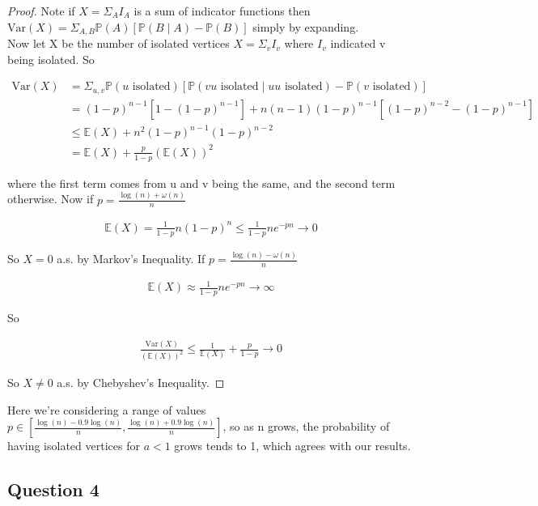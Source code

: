 \documentclass[10pt,a4paper]{report}
\begin{document}
\begin{proof}
Note if $X=\Sigma_A I_A$ is a sum of indicator functions then $\text{Var}(X)=\Sigma_{A,B}\mathbb{P}(A)[ \mathbb{P}(B \mid A) -\mathbb{P}(B)]$ simply by expanding.\\

Now let X be the number of isolated vertices $X=\Sigma_v I_v$ where $I_v$ indicated v being isolated. So 

\begin{align*}
\text{Var}(X)&=\Sigma_{u,v} \mathbb{P}(u \text{ isolated})[ \mathbb{P}(v u \text{ isolated} \mid u u \text{ isolated}) -\mathbb{P}(v \text{ isolated})]\\
&=(1-p)^{n-1}[1-(1-p)^{n-1}] + n(n-1)(1-p)^{n-1}[(1-p)^{n-2}-(1-p)^{n-1}]\\
&\leq \mathbb{E}(X)+n^2(1-p)^{n-1}(1-p)^{n-2}\\
&= \mathbb{E}(X) + \frac{p}{1-p}(\mathbb{E}(X))^2
\end{align*}

where the first term comes from u and v being the same, and the second term otherwise. Now if $p =\frac{\log(n)+\omega(n)}{n}$ 

\begin{align*}
\mathbb{E}(X) = \frac{1}{1-p}n(1-p)^n \leq \frac{1}{1-p}ne^{-pn} \rightarrow 0
\end{align*}

So $X=0$ a.s. by Markov's Inequality. If $p =\frac{\log(n)-\omega(n)}{n}$ 

\begin{align*}
\mathbb{E}(X) \approx \frac{1}{1-p}ne^{-pn} \rightarrow \infty
\end{align*}

So 

\begin{align*}
\frac{\text{Var}(X)}{(\mathbb{E}(X))^2} \leq \frac{1}{\mathbb{E}(X)} + \frac{p}{1-p} \rightarrow 0
\end{align*}

So $X\neq0$ a.s. by Chebyshev's Inequality.

\end{proof}

Here we're considering a range of values $p\in[\frac{\log(n)-0.9\log(n)}{n},\frac{\log(n)+0.9\log(n)}{n} ]$, so as n grows, the probability of having isolated vertices for $a<1$ grows tends to 1, which agrees with our results.

\subsection*{Question 4}
\end{document}
